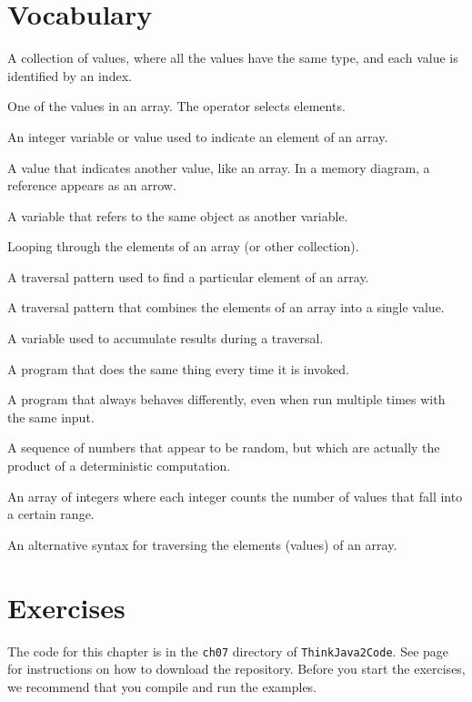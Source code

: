 \section{Vocabulary}

\begin{description}

A collection of values, where all the values have the same type, and each value is identified by an index.

One of the values in an array.
The \java{[]} operator selects elements.

An integer variable or value used to indicate an element of an array.

A value that indicates another value, like an array.
In a memory diagram, a reference appears as an arrow.

A variable that refers to the same object as another variable.

Looping through the elements of an array (or other collection).

A traversal pattern used to find a particular element of an array.

A traversal pattern that combines the elements of an array into a single value.

A variable used to accumulate results during a traversal.

A program that does the same thing every time it is invoked.

A program that always behaves differently, even when run multiple times with the same input.

A sequence of numbers that appear to be random, but which are actually the product of a deterministic computation.

An array of integers where each integer counts the number of values that fall into a certain range.

An alternative syntax for traversing the elements (values) of an array.

\end{description}


\section{Exercises}

The code for this chapter is in the {\tt ch07} directory of {\tt ThinkJava2Code}.
See page~\pageref{code} for instructions on how to download the repository.
Before you start the exercises, we recommend that you compile and run the examples.


